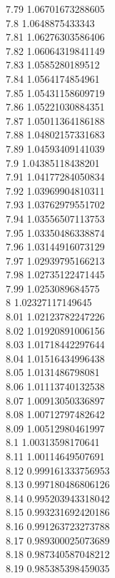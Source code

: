 {7.79	1.06701673288605\\
7.8	1.0648875433343\\
7.81	1.06276303586406\\
7.82	1.06064319841149\\
7.83	1.0585280189512\\
7.84	1.0564174854961\\
7.85	1.05431158609719\\
7.86	1.05221030884351\\
7.87	1.05011364186188\\
7.88	1.04802157331683\\
7.89	1.04593409141039\\
7.9	1.04385118438201\\
7.91	1.04177284050834\\
7.92	1.03969904810311\\
7.93	1.03762979551702\\
7.94	1.03556507113753\\
7.95	1.03350486338874\\
7.96	1.03144916073129\\
7.97	1.02939795166213\\
7.98	1.02735122471445\\
7.99	1.0253089684575\\
8	1.02327117149645\\
8.01	1.02123782247226\\
8.02	1.01920891006156\\
8.03	1.01718442297644\\
8.04	1.01516434996438\\
8.05	1.0131486798081\\
8.06	1.01113740132538\\
8.07	1.00913050336897\\
8.08	1.00712797482642\\
8.09	1.00512980461997\\
8.1	1.00313598170641\\
8.11	1.00114649507691\\
8.12	0.999161333756953\\
8.13	0.997180486806126\\
8.14	0.995203943318042\\
8.15	0.993231692420186\\
8.16	0.991263723273788\\
8.17	0.989300025073689\\
8.18	0.987340587048212\\
8.19	0.985385398459035\\
}
